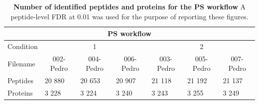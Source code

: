 \documentclass[11pt]{article}
\begin{document}
\begin{table}[h]
    \begin{tabular}{lllllll}
    \hline
    \multicolumn{7}{c}{PS workflow}                                                                                                                                                                                   \\ \hline
    Condition & \multicolumn{3}{c}{1}                                                                         & \multicolumn{3}{c}{2}                                                                         \\
    Filename       & \multicolumn{1}{c}{002-Pedro} & \multicolumn{1}{c}{004-Pedro} & \multicolumn{1}{c}{006-Pedro} & \multicolumn{1}{c}{003-Pedro} & \multicolumn{1}{c}{005-Pedro} & \multicolumn{1}{c}{007-Pedro} \\
    Peptides  & 20 880                        & 20 653                        & 20 907                        & 21 118                        & 21 192                        & 21 137                        \\
    Proteins  & 3 228                         & 3 224                         & 3 240                         & 3 243                         & 3 255                         & 3 249                         \\ \hline
    \end{tabular}
     \caption{{\bf Number of identified peptides and proteins for the PS workflow} A peptide-level FDR at 0.01 was used for the purpose of reporting these figures.
          \label{fig:diann_peptide_and_protein_id}}
\end{table}
\end{document}
